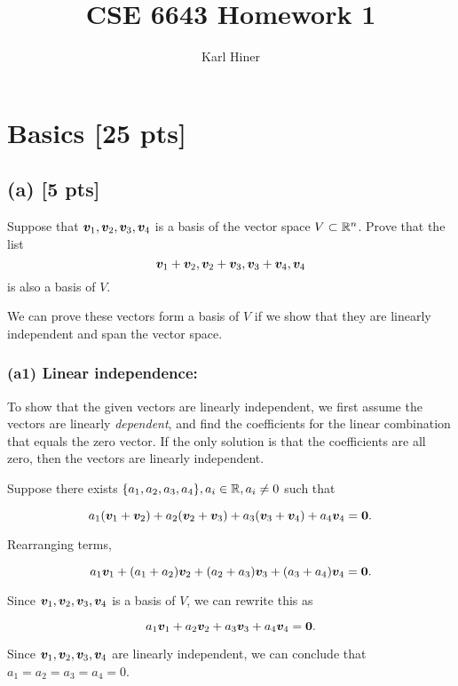 \documentclass[twoside,10pt]{article}
\newcommand{\eqn}[1]{\begin{equation}#1\end{equation}}
\begin{document}
\title{CSE 6643 Homework 1}
\author{Karl Hiner}
\date{}
\maketitle

\section{Basics [25 pts]}

\subsection*{(a) [5 pts]}
Suppose that $\bm{v}_1, \bm{v}_2, \bm{v}_3, \bm{v}_4$ is a basis of the vector space $V \subset \mathbb{R}^n$. Prove that the list 
\begin{equation}
  \bm{v}_1 + \bm{v}_2, \bm{v}_2 + \bm{v}_3, \bm{v}_3 + \bm{v}_4, \bm{v}_4
\end{equation}
is also a basis of $V$.

We can prove these vectors form a basis of $V$ if we show that they are linearly independent and span the vector space.

\subsubsection*{(a1) Linear independence:}

To show that the given vectors are linearly independent, we first assume the vectors are linearly \textit{dependent}, and find the coefficients for the linear combination that equals the zero vector.
If the only solution is that the coefficients are all zero, then the vectors are linearly independent.

Suppose there exists $\{a_1, a_2, a_3, a_4\}, a_i \in \mathbb{R}, a_i \neq 0$ such that

\eqn{a_1(\vct{v}_1 + \vct{v}_2) + a_2(\vct{v}_2 + \vct{v}_3) + a_3(\vct{v}_3 + \vct{v}_4) + a_4\vct{v}_4 = \vct{0}.}

Rearranging terms,

\eqn{a_1\vct{v}_1 + (a_1 + a_2)\vct{v}_2 + (a_2 + a_3)\vct{v}_3 + (a_3 + a_4)\vct{v}_4 = \vct{0}.}

Since $\bm{v}_1, \bm{v}_2, \bm{v}_3, \bm{v}_4$ is a basis of $V$, we can rewrite this as

\eqn{a_1\vct{v}_1 + a_2\vct{v}_2 + a_3\vct{v}_3 + a_4\vct{v}_4 = \vct{0}.}

Since $\bm{v}_1, \bm{v}_2, \bm{v}_3, \bm{v}_4$ are linearly independent, we can conclude that $a_1 = a_2 = a_3 = a_4 = 0$.
\end{document}
